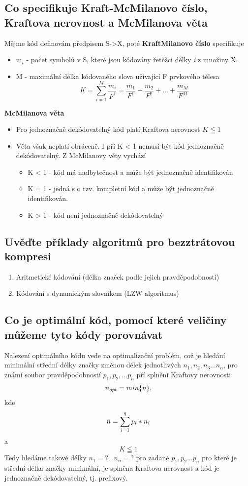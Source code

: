 \subsection{Co specifikuje Kraft-McMilanovo číslo, Kraftova nerovnost a McMilanova věta}
Mějme kód definovám předpisem S->X, poté \textbf{KraftMilanovo číslo} specifikuje
\begin{itemize}
    \item m$_i$ - počet symbolů v S, které jsou kódovány řetěžci dělky \emph{i} z množiny X.
    \item M - maximální délka kódovaného slova užívající F prvkového tělesa
    $$K = \sum_{i=1}^M \frac{m_i}{F^i}= \frac{m_1}{F^1} + \frac{m_2}{F^2} +\dots +\frac{m_M}{F^M}$$
\end{itemize}
\textbf{McMilanova věta}
\begin{itemize}
    \item Pro jednoznačně dekódovatelný kód platí Kraftova nerovnost $K \leqq 1$
    \item Věta však neplatí obráceně.
    I pří K < 1 nemusí být kód jednoznačně dekódovatelný.
    Z McMilanovy věty vychází
    \begin{itemize}
        \item K < 1 - kód má nadbytečnost a může být jednoznačně identifikován
        \item K = 1 - jedná s o tzv. kompletní kód a může být jednoznačně identifikován.
        \item K > 1 - kód není jednoznačně dekódovatelný
    \end{itemize}
\end{itemize}
\subsection{Uvěďte příklady algoritmů pro bezztrátovou kompresi}
\begin{enumerate}
    \item Aritmetické kódování (délka značek podle jejich pravděpodobností)
    \item Kódování s dynamickým slovníkem (LZW algoritmus)
\end{enumerate}

\subsection{Co je optimální kód, pomocí které veličiny můžeme tyto kódy porovnávat}
Nalezení optimálního kódu vede  na optimalizační problém, což je hledání minimální střední délky značky změnou délek jednotlivých $n_1, n_2, n_3 \dots n_n$, pro známí soubor pravděpodobností $p_1, p_2, \dots p_n$ pří splnění Kraftovy nerovnosti
$$\Bar{n}_{opt} = min \{\Bar{n}\},$$ kde
$$\Bar{n}=\sum_{i=1}^q p_i*n_i$$ a 
$$K\leqq1$$
Tedy hledáme takové délky $n_1=? \dots n_n=?$ pro zadané $p_1,p_2\dots p_n$ pro které je střední délka značky minimální, je splněna Kraftova nerovnost a kód je jednoznačně dekódovatelný, tj. prefixový.


